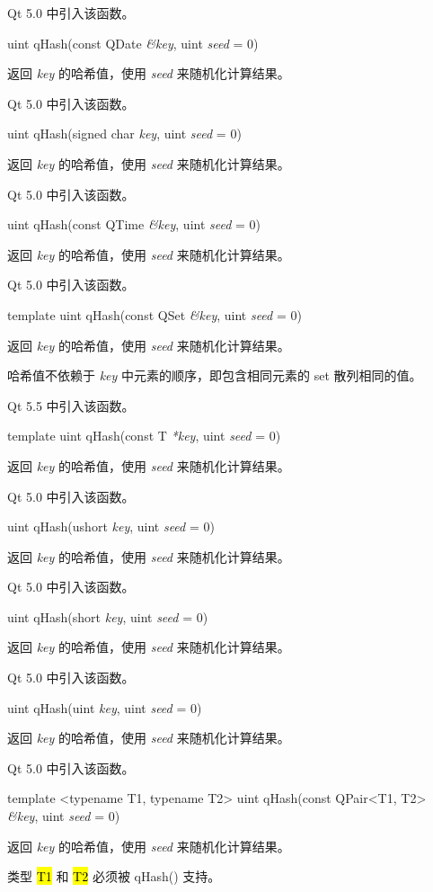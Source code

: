 Qt 5.0 中引入该函数。

uint qHash(const QDate \emph{\&key}, uint \emph{seed} = 0)

返回 \emph{key} 的哈希值，使用 \emph{seed} 来随机化计算结果。

Qt 5.0 中引入该函数。

uint qHash(signed char \emph{key}, uint \emph{seed} = 0)

返回 \emph{key} 的哈希值，使用 \emph{seed} 来随机化计算结果。

Qt 5.0 中引入该函数。

uint qHash(const QTime \emph{\&key}, uint \emph{seed} = 0)

返回 \emph{key} 的哈希值，使用 \emph{seed} 来随机化计算结果。

Qt 5.0 中引入该函数。

template uint qHash(const QSet \emph{\&key}, uint \emph{seed} = 0)

返回 \emph{key} 的哈希值，使用 \emph{seed} 来随机化计算结果。

哈希值不依赖于 \emph{key} 中元素的顺序，即包含相同元素的 set 散列相同的值。

Qt 5.5 中引入该函数。

template uint qHash(const T \emph{*key}, uint \emph{seed} = 0)

返回 \emph{key} 的哈希值，使用 \emph{seed} 来随机化计算结果。

Qt 5.0 中引入该函数。

uint qHash(ushort \emph{key}, uint \emph{seed} = 0)

返回 \emph{key} 的哈希值，使用 \emph{seed} 来随机化计算结果。

Qt 5.0 中引入该函数。

uint qHash(short \emph{key}, uint \emph{seed} = 0)

返回 \emph{key} 的哈希值，使用 \emph{seed} 来随机化计算结果。

Qt 5.0 中引入该函数。

uint qHash(uint \emph{key}, uint \emph{seed} = 0)

返回 \emph{key} 的哈希值，使用 \emph{seed} 来随机化计算结果。

Qt 5.0 中引入该函数。

template <typename T1, typename T2> uint qHash(const QPair<T1, T2> \emph{\&key}, uint \emph{seed} = 0)

返回 \emph{key} 的哈希值，使用 \emph{seed }来随机化计算结果。

类型 \hl{T1} 和 \hl{T2} 必须被 qHash() 支持。


